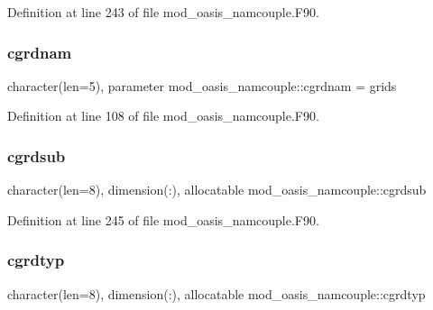 Definition at line 243 of file mod\+\_\+oasis\+\_\+namcouple.\+F90.

\mbox{\label{namespacemod__oasis__namcouple_afaa0549951c43335a2f8e75c7b1d2846}} 
\subsubsection{\texorpdfstring{cgrdnam}{cgrdnam}}
{\footnotesize\ttfamily character(len=5), parameter mod\+\_\+oasis\+\_\+namcouple\+::cgrdnam = \textquotesingle{}grids\textquotesingle{}\hspace{0.3cm}{\ttfamily [private]}}



Definition at line 108 of file mod\+\_\+oasis\+\_\+namcouple.\+F90.

\mbox{\label{namespacemod__oasis__namcouple_ac7f3cff3406912fe6e48c3cc7cf5436b}} 
\subsubsection{\texorpdfstring{cgrdsub}{cgrdsub}}
{\footnotesize\ttfamily character(len=8), dimension(\+:), allocatable mod\+\_\+oasis\+\_\+namcouple\+::cgrdsub\hspace{0.3cm}{\ttfamily [private]}}



Definition at line 245 of file mod\+\_\+oasis\+\_\+namcouple.\+F90.

\mbox{\label{namespacemod__oasis__namcouple_a795db0909c85ffadb601b744b5189ff5}} 
\subsubsection{\texorpdfstring{cgrdtyp}{cgrdtyp}}
{\footnotesize\ttfamily character(len=8), dimension(\+:), allocatable mod\+\_\+oasis\+\_\+namcouple\+::cgrdtyp\hspace{0.3cm}{\ttfamily [private]}}



